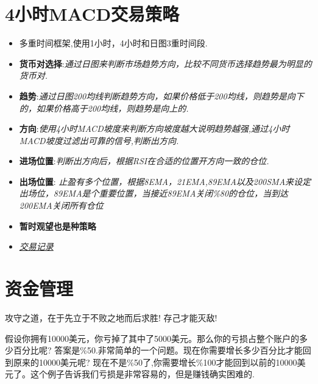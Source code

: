 \section{4小时MACD交易策略}


%


\begin{itemize}
\item 多重时间框架,使用1小时，4小时和日图3重时间段.
\item \textbf{货币对选择}:\textit{通过日图来判断市场趋势方向，比较不同货币选择趋势最为明显的货币对.}
\item \textbf{趋势}:\textit{通过日图200均线判断趋势方向，如果价格低于200均线，则趋势是向下的，如果价格高于200均线，则趋势是向上的.}
\item \textbf{方向}:\textit{使用4小时MACD坡度来判断方向坡度越大说明趋势越强,通过4小时MACD坡度过滤出可靠的信号,判断出方向.}
\item \textbf{进场位置}:\textit{判断出方向后，根据RSI在合适的位置开方向一致的仓位.}
\item \textbf{出场位置}: \textit{止盈有多个位置，根据8EMA，21EMA,89EMA以及200SMA来设定出场位，89EMA是个重要位置，当接近89EMA关闭\%80的仓位，当到达200EMA关闭所有仓位}
\item \textbf{暂时观望也是种策略}
\item \href{run:4Hour MACD deals.xlsm}{\textit{交易记录}} 
\end{itemize}

\section{资金管理}

攻守之道，在于先立于不败之地而后求胜! 存己才能灭敌!

假设你拥有10000美元，你亏掉了其中了5000美元。那么你的亏损占整个账户的多少百分比呢?
答案是\%50.非常简单的一个问题。现在你需要增长多少百分比才能回到原来的10000美元呢?
现在不是\%50了,你需要增长\%100才能回到以前的10000美元了。这个例子告诉我们亏损是非常容易的，但是赚钱确实困难的.

